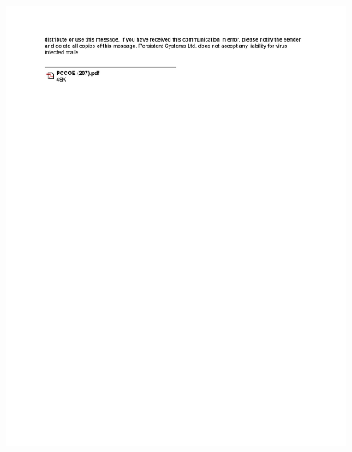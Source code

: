 \documentclass[oneside,a4paper,12pt]{report}
\begin{document}
{  \newpage {\bfseries \fontsize{14}{12} \selectfont
\vspace*{2\baselineskip}} \setlength{\parindent}{11mm} }
\begin{center}
	\begin{figure}[!htbp]
		\centering
		\includegraphics[width=\textwidth]{completion-letter-2}
	\end{figure}
\end{center}
\end{document}
